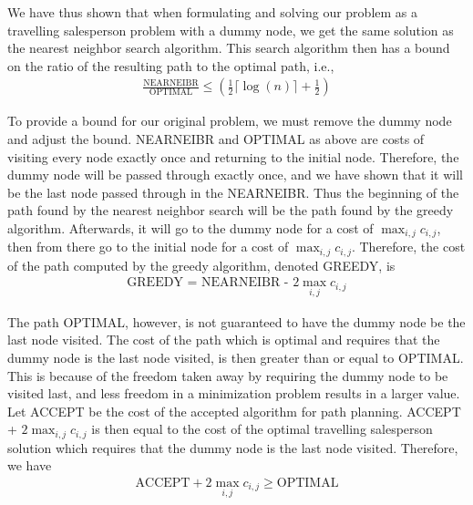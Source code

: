 We have thus shown that when formulating and solving our problem as a travelling salesperson problem with a dummy node, we get the same solution as the nearest neighbor search algorithm. This search algorithm then has a bound on the ratio of the resulting path to the optimal path, i.e.,\ 
\begin{align*}
\frac{\text{NEARNEIBR}}{\text{OPTIMAL}} \leq (\frac{1}{2} \lceil \log(n) \rceil + \frac{1}{2}) 
\end{align*}

To provide a bound for our original problem, we must remove the dummy node and adjust the bound. NEARNEIBR and OPTIMAL as above are costs of visiting every node exactly once and returning to the initial node. Therefore, the dummy node will be passed through exactly once, and we have shown that it will be the last node passed through in the NEARNEIBR. Thus the beginning of the path found by the nearest neighbor search will be the path found by the greedy algorithm. Afterwards, it will go to the dummy node for a cost of $\max_{i,j} c_{i,j}$, then from there go to the initial node for a cost of $\max_{i,j} c_{i,j}$. Therefore, the cost of the path computed by the greedy algorithm, denoted GREEDY, is 
\begin{align*}
\text{GREEDY = NEARNEIBR - } 2\max_{i,j} c_{i,j} 
\end{align*}

The path OPTIMAL, however, is not guaranteed to have the dummy node be the last node visited. The cost of the path which is optimal and requires that the dummy node is the last node visited, is then greater than or equal to OPTIMAL. This is because of the freedom taken away by requiring the dummy node to be visited last, and less freedom in a minimization problem results in a larger value. Let ACCEPT be the cost of the accepted algorithm for path planning. ACCEPT + $2\max_{i,j} c_{i,j}$ is then equal to the cost of the optimal travelling salesperson solution which requires that the dummy node is the last node visited. Therefore, we have
\begin{align*}
\text{ACCEPT} + 2\max_{i,j} c_{i,j} \geq \text{OPTIMAL}
\end{align*}

